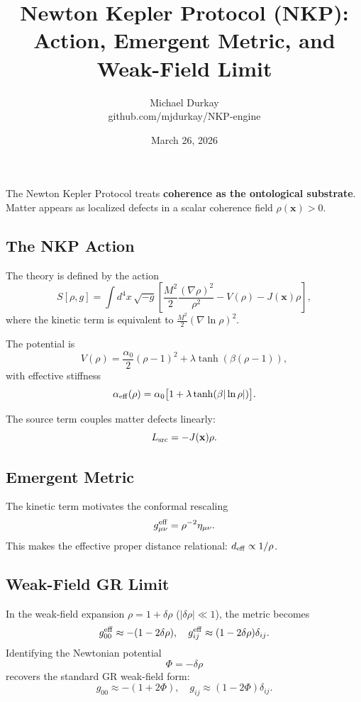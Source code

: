\documentclass[11pt,a4paper]{article}
\title{Newton Kepler Protocol (NKP): Action, Emergent Metric, and Weak-Field Limit}
\author{Michael Durkay \\ github.com/mjdurkay/NKP-engine}
\date{March 26, 2026}
\begin{document}
\maketitle

The Newton Kepler Protocol treats \textbf{coherence as the ontological substrate}. Matter appears as localized defects in a scalar coherence field \(\rho(\mathbf{x}) > 0\).

\subsection{The NKP Action}
The theory is defined by the action
\begin{equation}
S[\rho, g] = \int d^4x \, \sqrt{-g} \left[ \frac{M^2}{2} \frac{(\nabla \rho)^2}{\rho^2} - V(\rho) - J(\mathbf{x})\rho \right],
\end{equation}
where the kinetic term is equivalent to \(\frac{M^2}{2} (\nabla \ln \rho)^2\).

The potential is
\begin{equation}
V(\rho) = \frac{\alpha_0}{2} (\rho - 1)^2 + \lambda \tanh(\beta (\rho - 1)),
\end{equation}
with effective stiffness
\begin{equation}
\alpha_{\rm eff}(\rho) = \alpha_0 \bigl[1 + \lambda \tanh(\beta |\ln \rho|)\bigr].
\end{equation}

The source term couples matter defects linearly:
\begin{equation}
L_{\rm src} = -J(\mathbf{x})\rho.
\end{equation}

\subsection{Emergent Metric}
The kinetic term motivates the conformal rescaling
\begin{equation}
g_{\mu\nu}^{\rm eff} = \rho^{-2} \eta_{\mu\nu}.
\end{equation}
This makes the effective proper distance relational: \(d_{\rm eff} \propto 1/\rho\).

\subsection{Weak-Field GR Limit}
In the weak-field expansion \(\rho = 1 + \delta\rho\) (\(|\delta\rho| \ll 1\)), the metric becomes
\[
g_{00}^{\rm eff} \approx -(1 - 2\delta\rho), \quad g_{ij}^{\rm eff} \approx (1 - 2\delta\rho)\delta_{ij}.
\]
Identifying the Newtonian potential
\begin{equation}
\Phi = -\delta\rho
\end{equation}
recovers the standard GR weak-field form:
\[
g_{00} \approx -(1 + 2\Phi), \quad g_{ij} \approx (1 - 2\Phi)\delta_{ij}.
\]
\end{document}

